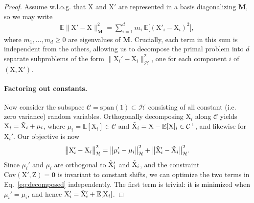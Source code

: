 \documentclass{article}
\theoremstyle{plain}
\theoremstyle{remark}
\newcommand{\E}{\mathbb E}
\theoremstyle{plain}
\theoremstyle{TheoremNum}
\newcommand{\rv}[1]{{\mathrm{#1}}}
\begin{document}
\begin{proof}
    Assume w.l.o.g. that $\rv X$ and $\rv X'$ are represented in a basis diagonalizing $\mathbf{M}$, so we may write
    \begin{align*}
        \E \big\| \rv X' - \rv X \big\|^2_{\mathbf M} = \sum_{i=1}^d m_i \: \E \big[ (\rv X'_i - \rv X_i)^2 \big],
    \end{align*}
    where $m_1, \ldots, m_d \ge 0$ are eigenvalues of $\mathbf{M}$. Crucially, each term in this sum is independent from the others, allowing us to decompose the primal problem into $d$ separate subproblems of the form $\| \rv X_i' - \rv X_i \|^2_{\mathcal H}$, one for each component $i$ of $(\rv X, \rv X')$.

    \paragraph{Factoring out constants.} Now consider the subspace $\mathcal C = \mathrm{span}(1) \subset \mathcal H$ consisting of all constant (i.e. zero variance) random variables. Orthogonally decomposing $\rv X_i$ along $\mathcal C$ yields $\rv X_i = \Tilde{\rv X}_i + \mu_i$, where $\mu_i = \E[\rv X_i] \in \mathcal C$ and $\Tilde{\rv X}_i = \rv X - \E[\rv X]_i \in \mathcal C^\perp$, and likewise for $\rv X_i'$. Our objective is now
\begin{equation}\label{eq:decomposed}
        \big \| \rv X_i' - \rv X_i \big \|^2_{\mathcal H} =
        \big \| \mu_i' - \mu_i \big \|^2_{\mathcal H} + \big \| \Tilde{\rv X}_i' - \Tilde{\rv X}_i \big \|^2_{\mathcal H}.
    \end{equation}
    Since $\mu_i'$ and $\mu_i$ are orthogonal to $\Tilde{\rv X}_i'$ and $\Tilde{\rv X}_i$, and the constraint $\mathrm{Cov}(\rv X', \rv Z) = \mathbf{0}$ is invariant to constant shifts, we can optimize the two terms in Eq.~\ref{eq:decomposed} independently. The first term is trivial: it is minimized when $\mu_i' = \mu_i$, and hence $\rv X_i' = \Tilde{\rv X}_i' + \E[\rv X_i]$.

\end{proof}
\end{document}
